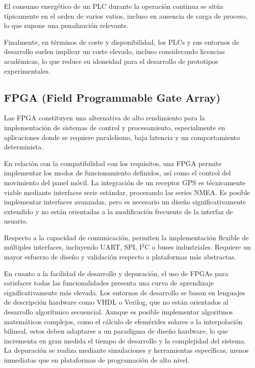 El consumo energético de un PLC durante la operación continua se sitúa típicamente en el orden de varios vatios, incluso en ausencia de carga de proceso, lo que supone una penalización relevante.

Finalmente, en términos de coste y disponibilidad, los PLCs y sus entornos de desarrollo suelen implicar un coste elevado, incluso considerando licencias académicas, lo que reduce su idoneidad para el desarrollo de prototipos experimentales.

\subsection{FPGA (Field Programmable Gate Array)}

Las FPGA constituyen una alternativa de alto rendimiento para la implementación de sistemas de control y procesamiento, especialmente en aplicaciones donde se requiere paralelismo, baja latencia y un comportamiento determinista.

En relación con la compatibilidad con los requisitos, una FPGA permite implementar los modos de funcionamiento definidos, así como el control del movimiento del panel móvil. La integración de un receptor GPS es técnicamente viable mediante interfaces serie estándar, procesando las series NMEA. Es posible implementar interfaces avanzadas, pero es necesario un diseño significativamente extendido y no están orientadas a la modificación frecuente de la interfaz de usuario.

Respecto a la capacidad de comunicación, permiten la implementación flexible de múltiples interfaces, incluyendo UART, SPI, I$^2$C o buses industriales. Requiere un mayor esfuerzo de diseño y validación respecto a plataformas más abstractas.

En cuanto a la facilidad de desarrollo y depuración, el uso de FPGAs para satisfacer todas las funcionalidades presenta una curva de aprendizaje significativamente más elevada. Los entornos de desarrollo se basan en lenguajes de descripción hardware como VHDL o Verilog, que no están orientados al desarrollo algorítmico secuencial. Aunque es posible implementar algoritmos matemáticos complejos, como el cálculo de efemérides solares o la interpolación bilineal, estos deben adaptarse a un paradigma de diseño hardware, lo que incrementa en gran medida el tiempo de desarrollo y la complejidad del sistema. La depuración se realiza mediante simulaciones y herramientas específicas, menos inmediatas que en plataformas de programación de alto nivel.

